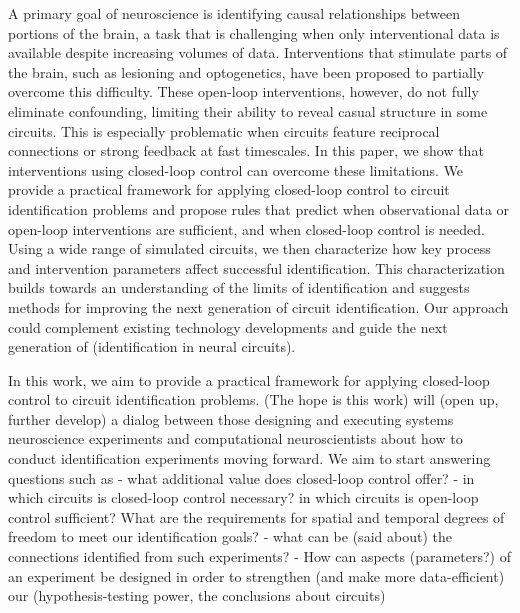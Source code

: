 A primary goal of neuroscience is identifying causal relationships between portions of the brain,
a task that is challenging when only interventional data is available despite increasing volumes of data.
Interventions that stimulate parts of the brain, such as lesioning and optogenetics, have been proposed to partially overcome this difficulty.
These open-loop interventions, however, do not fully eliminate confounding, limiting their ability to reveal casual structure in some circuits. This is especially problematic when circuits feature reciprocal connections or strong feedback at fast timescales.
In this paper, we show that interventions using closed-loop control can overcome these limitations.
We provide a practical framework for applying closed-loop control to circuit identification problems and propose rules that predict when observational data or open-loop interventions are sufficient, and when closed-loop control is needed. Using a wide range of simulated circuits, we then characterize how key process and intervention parameters affect successful identification. This characterization builds towards an understanding of the limits of identification  and suggests methods for improving the next generation of circuit identification.
Our approach could complement existing technology developments and guide the next generation of (identification in neural circuits).


In this work, we aim to provide a practical framework for applying closed-loop control to circuit identification problems. (The hope is this work) will (open up, further develop) a dialog between those designing and executing systems neuroscience experiments and computational neuroscientists about how to conduct identification experiments moving forward. We aim to start answering questions such as
- what additional value does closed-loop control offer?
- in which circuits is closed-loop control necessary? in which circuits is open-loop control sufficient? What are the requirements for spatial and temporal degrees of freedom to meet our identification goals?
- what can be (said about) the connections identified from such experiments? 
- How can aspects (parameters?) of an experiment be designed in order to strengthen (and make more data-efficient) our (hypothesis-testing power, the conclusions about circuits)

